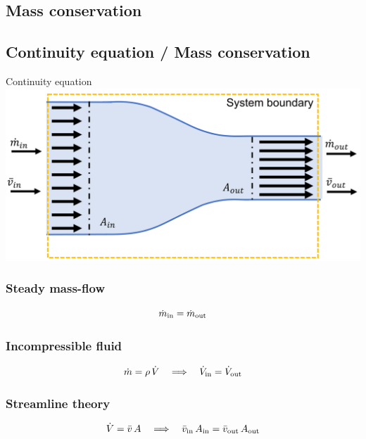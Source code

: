 \documentclass{article}
\begin{document}
\newpage
\begin{multicols}{2}
\setlength{\columnsep}{1pt}

\section{Mass conservation}
\subsection{Continuity equation / Mass conservation}
\begin{theorybox}{Continuity equation}
    \includegraphics[width=\textwidth]{media/ContinuityBild1.png}
    \subsubsection{Steady mass-flow}
    \begin{equation}
    \dot m_{\rm in} = \dot m_{\rm out}
    \end{equation}

    \subsubsection{Incompressible fluid}
    \begin{equation}
    \dot m = \rho\,\dot V
    \quad\Longrightarrow\quad
    \dot V_{\rm in} = \dot V_{\rm out}
    \end{equation}

    \subsubsection{Streamline theory}
    \begin{equation}
    \dot V = \bar v\,A
    \quad\Longrightarrow\quad
    \bar v_{\rm in}\,A_{\rm in} = \bar v_{\rm out}\,A_{\rm out}
    \end{equation}
\end{theorybox}


\end{multicols}
\end{document}
